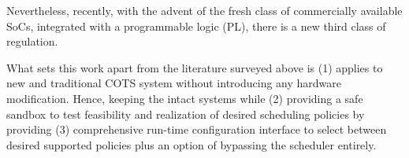 Nevertheless, recently, with the advent of the fresh class of commercially available SoCs, integrated with a programmable logic (PL), there is a new third class of regulation.


What sets this work apart from the literature surveyed above is
(1) \schim applies to new and traditional COTS system without introducing any hardware modification. Hence, keeping the intact systems while (2) providing a safe sandbox to test feasibility and realization of desired scheduling policies by providing (3) comprehensive run-time configuration interface to select between desired supported policies plus an option of bypassing the scheduler entirely.